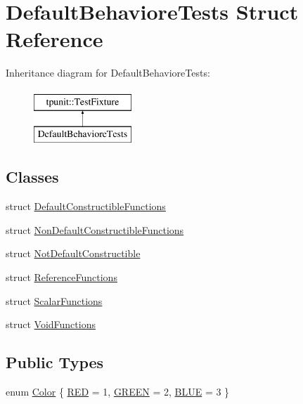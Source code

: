 \hypertarget{structDefaultBehavioreTests}{}\section{Default\+Behaviore\+Tests Struct Reference}
\label{structDefaultBehavioreTests}
Inheritance diagram for Default\+Behaviore\+Tests\+:\begin{figure}[H]
\begin{center}
\leavevmode
\includegraphics[height=2.000000cm]{structDefaultBehavioreTests}
\end{center}
\end{figure}
\subsection*{Classes}
\begin{DoxyCompactItemize}
\item 
struct \mbox{\hyperlink{structDefaultBehavioreTests_1_1DefaultConstructibleFunctions}{Default\+Constructible\+Functions}}
\item 
struct \mbox{\hyperlink{structDefaultBehavioreTests_1_1NonDefaultConstructibleFunctions}{Non\+Default\+Constructible\+Functions}}
\item 
struct \mbox{\hyperlink{structDefaultBehavioreTests_1_1NotDefaultConstructible}{Not\+Default\+Constructible}}
\item 
struct \mbox{\hyperlink{structDefaultBehavioreTests_1_1ReferenceFunctions}{Reference\+Functions}}
\item 
struct \mbox{\hyperlink{structDefaultBehavioreTests_1_1ScalarFunctions}{Scalar\+Functions}}
\item 
struct \mbox{\hyperlink{structDefaultBehavioreTests_1_1VoidFunctions}{Void\+Functions}}
\end{DoxyCompactItemize}
\subsection*{Public Types}
\begin{DoxyCompactItemize}
\item 
enum \mbox{\hyperlink{structDefaultBehavioreTests_a0125c0fb6d312ce842f4106491751506}{Color}} \{ \mbox{\hyperlink{structDefaultBehavioreTests_a0125c0fb6d312ce842f4106491751506abd3e08bb78bb9cb5f85b34a698318652}{R\+ED}} = 1, 
\mbox{\hyperlink{structDefaultBehavioreTests_a0125c0fb6d312ce842f4106491751506a46c2d5db2d4efd2c9353f40d9d8db6f9}{G\+R\+E\+EN}} = 2, 
\mbox{\hyperlink{structDefaultBehavioreTests_a0125c0fb6d312ce842f4106491751506ac610cfdf0abc2af0e8efa177134b1710}{B\+L\+UE}} = 3
 \}
\end{DoxyCompactItemize}
